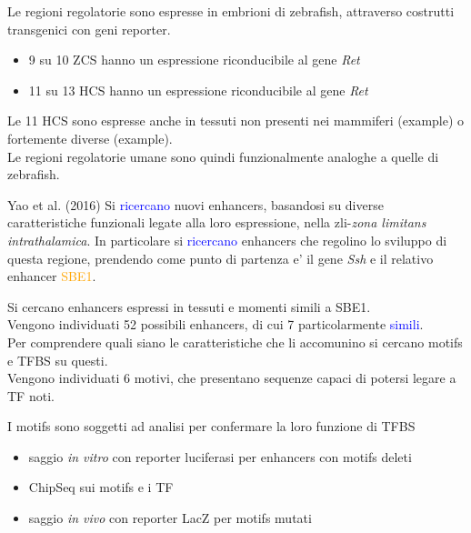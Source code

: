 \documentclass{beamer}
\newcommand{\warn}[1]{\textcolor{blue}{#1}}
\newcommand{\hh}[1]{\textcolor{orange}{#1}}
\begin{document}
    \begin{frame}
        Le regioni regolatorie sono espresse in embrioni di zebrafish,
        attraverso costrutti transgenici con geni reporter.
        \begin{itemize}
            \item 9 su 10 ZCS hanno un espressione riconducibile al gene \emph{Ret}
            \item 11 su 13 HCS hanno un espressione riconducibile al gene \emph{Ret}
        \end{itemize}
    \end{frame}

    \begin{frame}
        Le 11 HCS sono espresse anche in tessuti non presenti nei mammiferi (example)
        o fortemente diverse (example). \\
        Le regioni regolatorie umane sono quindi funzionalmente analoghe a quelle di zebrafish.
    \end{frame}


    \begin{frame}{Yao et al. (2016)}
        Si \warn{ricercano} nuovi enhancers, basandosi su diverse caratteristiche funzionali
        legate alla loro espressione, nella zli-\emph{zona limitans intrathalamica}.
        In particolare si \warn{ricercano} enhancers che regolino lo sviluppo di questa regione,
        prendendo come punto di partenza e' il gene \emph{Ssh} e il relativo enhancer \hh{SBE1}.
    \end{frame}

    \begin{frame}
        Si cercano enhancers espressi in tessuti e momenti simili a SBE1.\\
        Vengono individuati 52 possibili enhancers, di cui 7 particolarmente \warn{simili}.\\
        Per comprendere quali siano le caratteristiche che li accomunino si
        cercano motifs e TFBS su questi.\\
        Vengono individuati 6 motivi, che presentano sequenze capaci di potersi legare a TF noti.
    \end{frame}

    \begin{frame}
        I motifs sono soggetti ad analisi per confermare la loro funzione di TFBS
        \begin{itemize}
            \item saggio \emph{in vitro} con reporter luciferasi per enhancers con motifs deleti
            \item ChipSeq sui motifs e i TF
            \item saggio \emph{in vivo} con reporter LacZ per motifs mutati
        \end{itemize}
    \end{frame}
\end{document}
